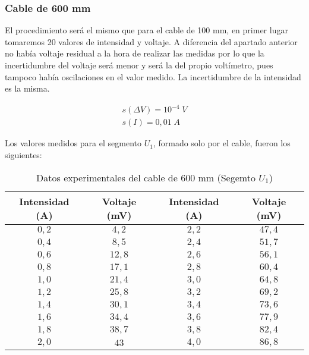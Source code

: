 \documentclass[a4paper,12pt,titlepage]{article}
\begin{document}
\subsubsection{Cable de 600 mm}

El procedimiento será el mismo que para el cable de 100 mm, en primer lugar tomaremos 20 valores de intensidad y voltaje. A diferencia del apartado anterior no había voltaje residual a la hora de realizar las medidas por lo que la incertidumbre del voltaje será menor y será la del propio voltímetro, pues tampoco había oscilaciones en el valor medido. La incertidumbre de la intensidad es la misma.

\begin{equation}
    \begin{gathered}
        s(\Delta V) = 10^{-4} \; V \\
        s(I) = 0,01\; A
    \end{gathered}
\end{equation}

Los valores medidos para el segmento $U_{1}$, formado solo por el cable, fueron los siguientes:

\begin{table}[h!]
    \centering
    \begin{tabular}{|c|c|c|c|}
        \hline
        Intensidad (A) & Voltaje (mV) & Intensidad (A) & Voltaje (mV) \\
        \hline
        $0,2$ & $4,2$ & $2,2$ & $47,4$ \\
        \hline
        $0,4$ & $8,5$ & $2,4$ & $51,7$ \\
        \hline
        $0,6$ & $12,8$ & $2,6$ & $56,1$ \\
        \hline
        $0,8$ & $17,1$ & $2,8$ & $60,4$ \\
        \hline
        $1,0$ & $21,4$ & $3,0$ & $64,8$ \\
        \hline
        $1,2$ & $25,8$ & $3,2$ & $69,2$ \\
        \hline
        $1,4$ & $30,1$ & $3,4$ & $73,6$ \\
        \hline
        $1,6$ & $34,4$ & $3,6$ & $77,9$ \\
        \hline
        $1,8$ & $38,7$ & $3,8$ & $82,4$ \\
        \hline
        $2,0$ & $43$ & $4,0$ & $86,8$ \\
        \hline
    \end{tabular}
    \caption{Datos experimentales del cable de 600 mm (Segemto $U_{1}$)}
\end{table}
\end{document}
